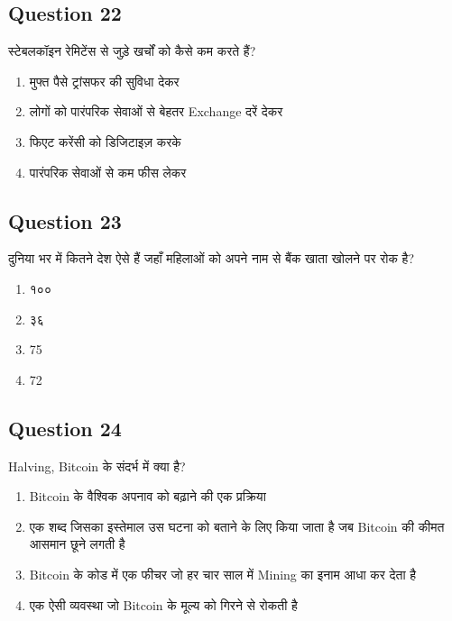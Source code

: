\documentclass[12pt,a4paper]{article}
\begin{document}
\bigskip


\subsection*{Question 22}
स्टेबलकॉइन रेमिटेंस से जुड़े खर्चों को कैसे कम करते हैं?

\begin{enumerate}[label=\Alph*., leftmargin=*]
\item मुफ्त पैसे ट्रांसफर की सुविधा देकर
\item लोगों को पारंपरिक सेवाओं से बेहतर Exchange दरें देकर
\item फिएट करेंसी को डिजिटाइज़ करके
\item पारंपरिक सेवाओं से कम फीस लेकर
\end{enumerate}

\bigskip


\subsection*{Question 23}
दुनिया भर में कितने देश ऐसे हैं जहाँ महिलाओं को अपने नाम से बैंक खाता खोलने पर रोक है?

\begin{enumerate}[label=\Alph*., leftmargin=*]
\item १००
\item ३६
\item 75
\item 72
\end{enumerate}

\bigskip


\subsection*{Question 24}
Halving, Bitcoin के संदर्भ में क्या है?

\begin{enumerate}[label=\Alph*., leftmargin=*]
\item Bitcoin के वैश्विक अपनाव को बढ़ाने की एक प्रक्रिया
\item एक शब्द जिसका इस्तेमाल उस घटना को बताने के लिए किया जाता है जब Bitcoin की कीमत आसमान छूने लगती है
\item Bitcoin के कोड में एक फीचर जो हर चार साल में Mining का इनाम आधा कर देता है
\item एक ऐसी व्यवस्था जो Bitcoin के मूल्य को गिरने से रोकती है
\end{enumerate}

\bigskip
\end{document}
